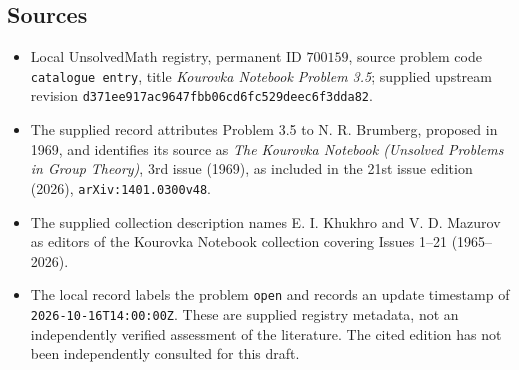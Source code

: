 \documentclass[11pt]{article}
\begin{document}
\subsection{Sources}
\begin{itemize}
\item Local UnsolvedMath registry, permanent ID \(700159\), source problem code \texttt{catalogue entry}, title \emph{Kourovka Notebook Problem 3.5}; supplied upstream revision \texttt{d371ee917ac9647fbb06cd6fc529deec6f3dda82}.
\item The supplied record attributes Problem 3.5 to N. R. Brumberg, proposed in 1969, and identifies its source as \emph{The Kourovka Notebook (Unsolved Problems in Group Theory)}, 3rd issue (1969), as included in the 21st issue edition (2026), \texttt{arXiv:1401.0300v48}.
\item The supplied collection description names E. I. Khukhro and V. D. Mazurov as editors of the Kourovka Notebook collection covering Issues 1--21 (1965--2026).
\item The local record labels the problem \texttt{open} and records an update timestamp of \texttt{2026-10-16T14:00:00Z}. These are supplied registry metadata, not an independently verified assessment of the literature. The cited edition has not been independently consulted for this draft.
\end{itemize}
\end{document}
